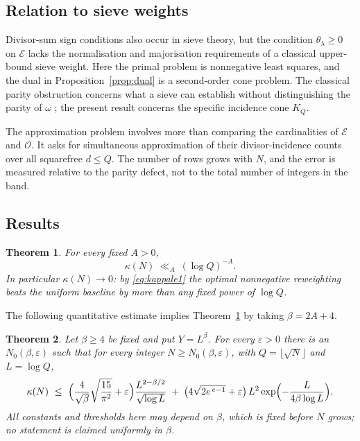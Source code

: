 \documentclass[11pt,a4paper]{article}
\theoremstyle{plain}
\newtheorem{theorem}{Theorem}
\theoremstyle{definition}
\theoremstyle{remark}
\newcommand{\vB}{\mathcal{E}}
\newcommand{\vR}{\mathcal{O}}
\newcommand{\eps}{\varepsilon}
\begin{document}
\subsection{Relation to sieve weights}\label{sec:orientation}
Divisor-sum sign conditions also occur in sieve theory, but the condition
$\theta_\lambda\ge0$ on $\vB$ lacks the normalisation and majorisation requirements of a classical
upper-bound sieve weight. Here the primal problem is nonnegative least squares, and the dual in
Proposition~\ref{prop:dual} is a second-order cone problem. The classical parity obstruction concerns
what a sieve can establish without distinguishing the parity of $\omega$
\cite[ch.~16]{OperaDeCribro}; the present result concerns the specific incidence cone $K_Q$.

The approximation problem involves more than comparing the cardinalities of $\vB$ and $\vR$.
It asks for simultaneous approximation of their divisor-incidence counts over all squarefree
$d\le Q$. The number of rows grows with $N$, and the error is measured relative to the parity defect,
not to the total number of integers in the band.

\subsection{Results}\label{sec:results}

\begin{theorem}\label{thm:main}
For every fixed $A>0$,
\[
  \kappa(N)\ \ll_{A}\ (\log Q)^{-A} .
\]
In particular $\kappa(N)\to0$: by \eqref{eq:kappale1} the optimal nonnegative reweighting beats the
uniform baseline by more than any fixed power of $\log Q$.
\end{theorem}

The following quantitative estimate implies Theorem~\ref{thm:main} by taking
$\beta=2A+4$.

\begin{theorem}\label{thm:quant}
Let $\beta\ge4$ be fixed and put $Y=L^{\beta}$. For every $\eps>0$ there is an $N_{0}(\beta,\eps)$ such
that for every integer $N\ge N_{0}(\beta,\eps)$, with $Q=\lfloor\sqrt N\rfloor$ and $L=\log Q$,
\[
  \kappa(N)\ \le\ \Bigl(\frac4{\sqrt\beta}\sqrt{\frac{15}{\pi^{2}}}+\eps\Bigr)
      \frac{L^{2-\beta/2}}{\sqrt{\log L}}
   \;+\;\bigl(4\sqrt{2e^{\,e-1}}+\eps\bigr)\,L^{2}\exp\Bigl(-\frac L{4\beta\log L}\Bigr).
\]
All constants and thresholds here may depend on $\beta$, which is fixed before $N$ grows; no statement is
claimed uniformly in $\beta$.
\end{theorem}
\end{document}
